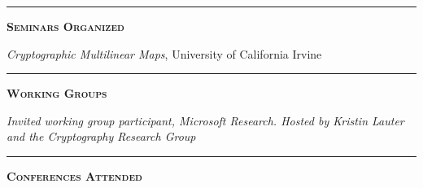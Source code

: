 \documentclass[12pt]{article}
\newcommand{\sectionheading}[1]
{
\bigskip %
\noindent
\hspace{-6.5mm}\textcolor{Gray}{\rule[.75mm]{21.5mm}{1mm}} %
\hspace{.2mm}	%
{\large{\textbf{\textsc{#1}}}} %
}
\newenvironment{date_section}
	{
	\vspace{-1ex}
	\leftmargini = 15ex
		\begin{itemize}[
			labelsep = *,
			labelwidth = 9ex,
			labelindent = 0ex,
			itemindent = !,
			font=\normalfont,
			align=parleft
		]{}
		\itemsep=-1.5mm
	}
	{\end{itemize}\vspace{-2ex}}
\newcommand{\yearmo}[2]{
	\item[
		{\makebox[1ex][r]{#1}}
		\hspace{1ex}
		{\makebox[1ex][l]{#2} }
		] }
\newcommand{\yearrange}[2]{
	\item[
		{\makebox[1ex][r]{#1}}
		--
		{\makebox[1ex][l]{#2} }
		] }
\begin{document}
	\sectionheading{Seminars Organized} %

	\begin{date_section}
		\yearrange{2018}{cur.} %
		\emph{Cryptographic Multilinear Maps}, University of California Irvine
	\end{date_section}


	\sectionheading{Working Groups} %

	\begin{date_section}
		\yearmo{2019}{Jun.} %
		\emph{Invited working group participant, Microsoft Research. Hosted by Kristin Lauter and the Cryptography Research Group}
	\end{date_section}

	\sectionheading{Conferences Attended} %
\end{document}
